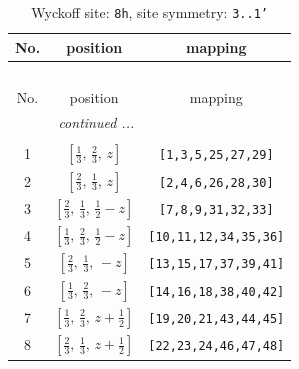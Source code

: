\documentclass[fleqn,8pt]{jsarticle}
\begin{document}
\begin{longtable}{ccc}
\caption{Wyckoff site: {\tt 8h}, site symmetry: {\tt 3..1'}}
 \\
 \hline \hline
No. & position & mapping \\ \hline \endfirsthead

\multicolumn{2}{l}{\tablename\ \thetable{}} \\
 \hline \hline
No. & position & mapping \\ \hline \endhead

 \hline \hline
\multicolumn{2}{r}{\footnotesize\it continued ...} \\ \endfoot

 \hline \hline
\multicolumn{2}{r}{} \\ \endlastfoot

1 & $\left[ \frac{1}{3},\, \frac{2}{3},\, z \right]$ & {\tt [1,3,5,25,27,29]} \\ \hline
2 & $\left[ \frac{2}{3},\, \frac{1}{3},\, z \right]$ & {\tt [2,4,6,26,28,30]} \\ \hline
3 & $\left[ \frac{2}{3},\, \frac{1}{3},\, \frac{1}{2} - z \right]$ & {\tt [7,8,9,31,32,33]} \\ \hline
4 & $\left[ \frac{1}{3},\, \frac{2}{3},\, \frac{1}{2} - z \right]$ & {\tt [10,11,12,34,35,36]} \\ \hline
5 & $\left[ \frac{2}{3},\, \frac{1}{3},\, - z \right]$ & {\tt [13,15,17,37,39,41]} \\ \hline
6 & $\left[ \frac{1}{3},\, \frac{2}{3},\, - z \right]$ & {\tt [14,16,18,38,40,42]} \\ \hline
7 & $\left[ \frac{1}{3},\, \frac{2}{3},\, z + \frac{1}{2} \right]$ & {\tt [19,20,21,43,44,45]} \\ \hline
8 & $\left[ \frac{2}{3},\, \frac{1}{3},\, z + \frac{1}{2} \right]$ & {\tt [22,23,24,46,47,48]} \\
\end{longtable}
\renewcommand{\arraystretch}{1.2}
\end{document}
